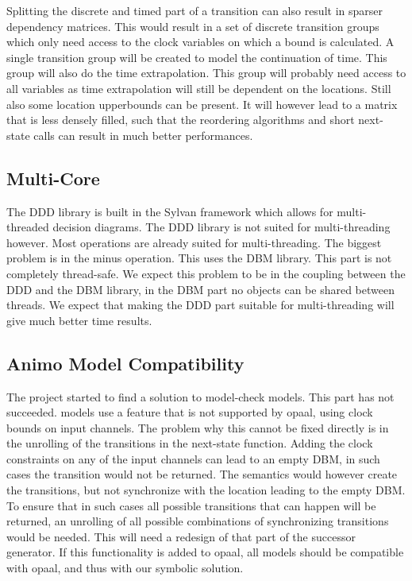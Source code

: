 Splitting the discrete and timed part of a transition can also result in sparser dependency matrices. This would result in a set of discrete transition groups which only need access to the clock variables on which a bound is calculated. A single transition group will be created to model the continuation of time. This group will also do the time extrapolation. This group will probably need access to all variables as time extrapolation will still be dependent on the locations. Still also some location upperbounds can be present. It will however lead to a matrix that is less densely filled, such that the reordering algorithms and short next-state calls can result in much better performances.

\subsection{Multi-Core}
The DDD library is built in the Sylvan framework which allows for multi-threaded decision diagrams. The DDD library is not suited for multi-threading however. Most operations are already suited for multi-threading.  The biggest problem is in the minus operation. This uses the DBM library. This part is not completely thread-safe. We expect this problem to be in the coupling between the DDD and the DBM library, in the DBM part no objects can be shared between threads. We expect that making the DDD part suitable for multi-threading will give much better time results.

\subsection{Animo Model Compatibility}
The project started to find a solution to model-check \animo{} models. This part has not succeeded. \animo{} models use a \uppaal{} feature that is not supported by opaal, using clock bounds on input channels. The problem why this cannot be fixed directly is in the unrolling of the transitions in the next-state function. Adding the clock constraints on any of the input channels can lead to an empty DBM, in such cases the transition would not be returned. The semantics would however create the transitions, but not synchronize with the location leading to the empty DBM. To ensure that in such cases all possible transitions that can happen will be returned, an unrolling of all possible combinations of synchronizing transitions would be needed. This will need a redesign of that part of the successor generator. If this functionality is added to opaal, all \animo{} models should be compatible with opaal, and thus with our symbolic solution.

